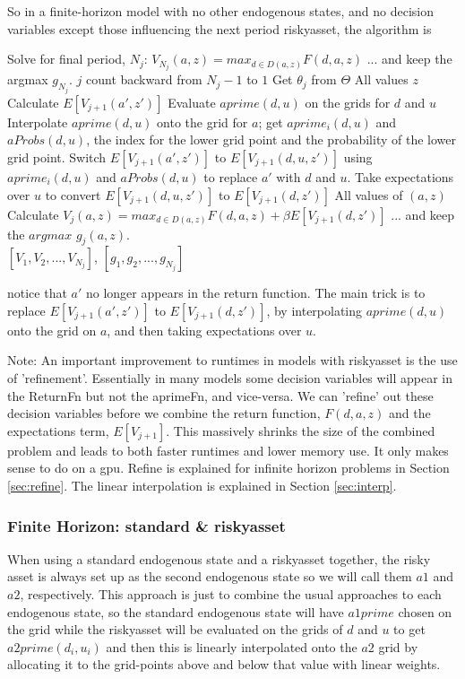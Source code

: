So in a finite-horizon model with no other endogenous states, and no decision variables except those influencing the next period riskyasset, the algorithm is
\begin{algorithmic}
 \State Solve for final period, $N_j$: $V_{N_j}(a,z)=max_{d\in D(a,z)} F(d,a,z)$
 \State ... and keep the argmax $g_{N_j}$.
 \For $j$ count backward from $N_j-1$ to $1$
   \State Get $\theta_j$ from $\Theta$
   \For All values $z$
    \State Calculate $E[V_{j+1}(a',z')]$
    \State Evaluate $aprime(d,u)$ on the grids for $d$ and $u$
    \State Interpolate $aprime(d,u)$ onto the grid for $a$; get $aprime_i(d,u)$ and $aProbs(d,u)$, the index for the lower grid point and the probability of the lower grid point.
    \State Switch $E[V_{j+1}(a',z')]$ to $E[V_{j+1}(d,u,z')]$ using $aprime_i(d,u)$ and $aProbs(d,u)$ to replace $a'$ with $d$ and $u$.
    \State Take expectations over $u$ to convert $E[V_{j+1}(d,u,z')]$ to $E[V_{j+1}(d,z')]$
    \For All values of $(a,z)$
     \State Calculate $V_j(a,z)=max_{d \in D(a,z)} F(d,a,z)+\beta E[V_{j+1}(d,z')]$
     \State ... and keep the $argmax$ $g_j(a,z)$.
     \EndFor
   \EndFor
  \EndFor
   \\ \Return $[V_1,V_2,...,V_{N_j}]$, $[g_1,g_2,...,g_{N_j}]$
\end{algorithmic}
notice that $a'$ no longer appears in the return function. The main trick is to replace $E[V_{j+1}(a',z')]$ to $E[V_{j+1}(d,z')]$, by interpolating $aprime(d,u)$ onto the grid on $a$, and then taking expectations over $u$.

Note: An important improvement to runtimes in models with riskyasset is the use of 'refinement'. Essentially in many models some decision variables will appear in the ReturnFn but not the aprimeFn, and vice-versa. We can 'refine' out these decision variables before we combine the return function, $F(d,a,z)$ and the expectations term, $E[V_{j+1}]$. This massively shrinks the size of the combined problem and leads to both faster runtimes and lower memory use. It only makes sense to do on a gpu. Refine is explained for infinite horizon problems in Section \ref{sec:refine}. The linear interpolation is explained in Section \ref{sec:interp}.

\subsubsection{Finite Horizon: standard \& riskyasset}
When using a standard endogenous state and a riskyasset together, the risky asset is always set up as the second endogenous state so we will call them $a1$ and $a2$, respectively. This approach is just to combine the usual approaches to each endogenous state, so the standard endogenous state will have $a1prime$ chosen on the grid while the riskyasset will be evaluated on the grids of $d$ and $u$ to get $a2prime(d_i,u_i)$ and then this is linearly interpolated onto the $a2$ grid by allocating it to the grid-points above and below that value with linear weights.


